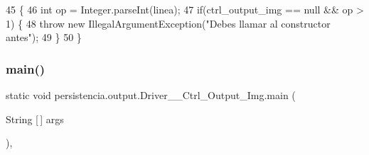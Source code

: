 \begin{DoxyCode}
45                                                                                           \{
46         \textcolor{keywordtype}{int} op = Integer.parseInt(linea);
47         \textcolor{keywordflow}{if}(ctrl\_output\_img == null && op > 1) \{
48             \textcolor{keywordflow}{throw} \textcolor{keyword}{new} IllegalArgumentException(\textcolor{stringliteral}{"Debes llamar al constructor antes"});
49         \}
50     \}
\end{DoxyCode}
\mbox{\label{classpersistencia_1_1output_1_1Driver____Ctrl__Output__Img_a7ea6be01dbe68f043b4fb50b7ba41f8b}} 
\subsubsection{\texorpdfstring{main()}{main()}}
{\footnotesize\ttfamily static void persistencia.\+output.\+Driver\+\_\+\+\_\+\+Ctrl\+\_\+\+Output\+\_\+\+Img.\+main (\begin{DoxyParamCaption}\item[{String \mbox{[}$\,$\mbox{]}}]{args }\end{DoxyParamCaption})\hspace{0.3cm}{\ttfamily [inline]}, {\ttfamily [static]}}


